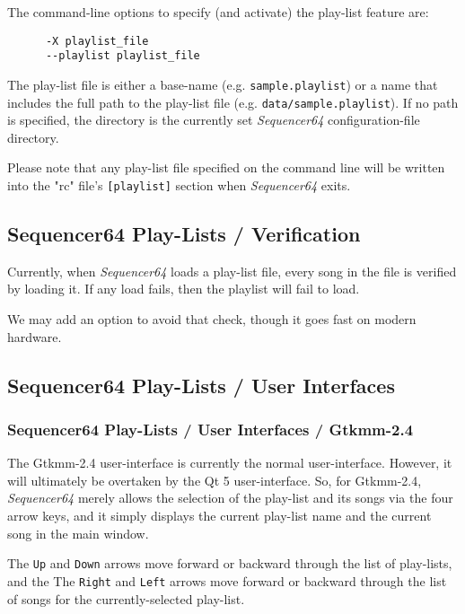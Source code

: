    The command-line options to specify (and activate) the play-list feature
   are:

   \begin{verbatim}
      -X playlist_file
      --playlist playlist_file
   \end{verbatim}

   The play-list file is either a base-name (e.g. \texttt{sample.playlist})
   or a name that includes the full path to the play-list file
   (e.g. \texttt{data/sample.playlist}).
   If no path is specified, the directory is the currently set
   \textsl{Sequencer64} configuration-file directory.

   Please note that any play-list file specified on the command line
   will be written into the "rc" file's \texttt{[playlist]} section when
   \textsl{Sequencer64} exits.

\subsection{Sequencer64 Play-Lists / Verification}
\label{subsec:playlist_verify}

   Currently, when \textsl{Sequencer64} loads a play-list file, every
   song in the file is verified by loading it.  If any load fails, then
   the playlist will fail to load.

   We may add an option to avoid that check, though it goes fast on
   modern hardware.

\subsection{Sequencer64 Play-Lists / User Interfaces}
\label{subsec:playlist_uis}

\subsubsection{Sequencer64 Play-Lists / User Interfaces / Gtkmm-2.4}
\label{subsubsec:playlist_ui_gtk}

   The Gtkmm-2.4 user-interface is currently the normal user-interface.
   However, it will ultimately be overtaken by the Qt 5 user-interface.
   So, for Gtkmm-2.4, \textsl{Sequencer64} merely allows the selection of the
   play-list and its songs via the four arrow keys, and it simply displays the
   current play-list name and the current song in the main window.

   The \texttt{Up} and \texttt{Down} arrows move forward or backward through
   the list of play-lists, and the
   The \texttt{Right} and \texttt{Left} arrows move forward or backward through
   the list of songs for the currently-selected play-list.

